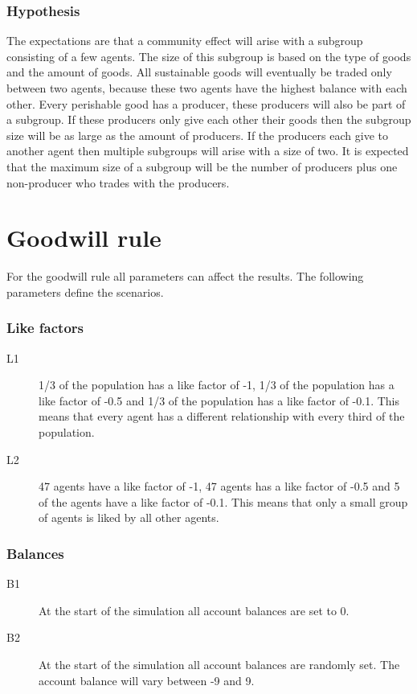 \documentclass[twoside,openright]{uva-bachelor-thesis}
\begin{document}
\subsubsection{Hypothesis}
The expectations are that a community effect will arise with a subgroup consisting of a few agents. The size of this subgroup is based on the type of goods and the amount of goods. All sustainable goods will eventually be traded only between two agents, because these two agents have the highest balance with each other. Every perishable good has a producer, these producers will also be part of a subgroup. If these producers only give each other their goods then the subgroup size will be as large as the amount of producers. If the producers each give to another agent then multiple subgroups will arise with a size of two. It is expected that the maximum size of a subgroup will be the number of producers plus one non-producer who trades with the producers.

\section{Goodwill rule}
For the goodwill rule all parameters can affect the results. The following parameters define the scenarios.
\subsubsection{Like factors}
\begin{description}
\item[L1]	1/3 of the population has a like factor of -1, 1/3 of the population has a like factor of -0.5 and 1/3 of the population has a like factor of -0.1. This means that every agent has a different relationship with every third of the population.
\item[L2]	47 agents have a like factor of -1, 47 agents has a like factor of -0.5 and 5 of the agents have a like factor of -0.1. This means that only a small group of agents is liked by all other agents.
\end{description}
\subsubsection{Balances}
\begin{description}
\item[B1]	At the start of the simulation all account balances are set to 0.
\item[B2]	At the start of the simulation all account balances are randomly set. The account balance will vary between -9 and 9.
\end{description}
\end{document}
